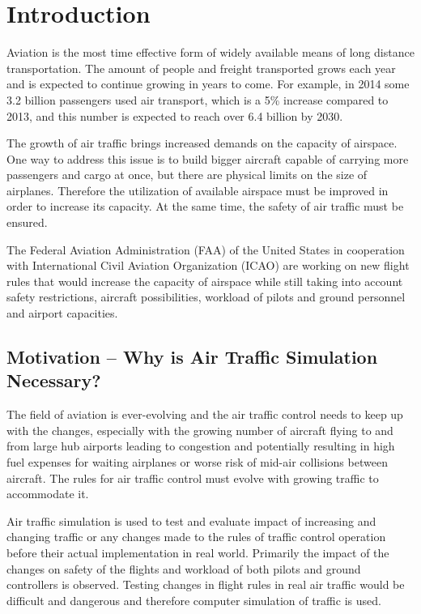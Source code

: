 \chapter{Introduction}

Aviation is the most time effective form of widely available means of long distance transportation. The amount of people and freight transported grows each year and is expected to continue growing in years to come. For example, in 2014 some 3.2 billion passengers used air transport, which is a 5\% increase compared to 2013, and this number is expected to reach over 6.4 billion by 2030. \cite{growth}

The growth of air traffic brings increased demands on the capacity of airspace. One way to address this issue is to build bigger aircraft capable of carrying more passengers and cargo at once, but there are physical limits on the size of airplanes. Therefore the utilization of available airspace must be improved in order to increase its capacity. At the same time, the safety of air traffic must be ensured.

The Federal Aviation Administration (FAA) of the United States in cooperation with International Civil Aviation Organization (ICAO) are working on new flight rules that would increase the capacity of airspace while still taking into account safety restrictions, aircraft possibilities, workload of pilots and ground personnel and airport capacities.

\section{Motivation – Why is Air Traffic Simulation Necessary?}

The field of aviation is ever-evolving and the air traffic control needs to keep up with the changes, especially with the growing number of aircraft flying to and from large hub airports leading to congestion and potentially resulting in high fuel expenses for waiting airplanes or worse risk of mid-air collisions between aircraft. The rules for air traffic control must evolve with growing traffic to accommodate it.

Air traffic simulation is used to test and evaluate impact of increasing and changing traffic or any changes made to the rules of traffic control operation before their actual implementation in real world. Primarily the impact of the changes on safety of the flights and workload of both pilots and ground controllers is observed. Testing changes in flight rules in real air traffic would be difficult and dangerous and therefore computer simulation of traffic is used.

